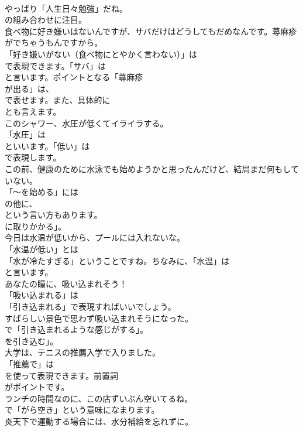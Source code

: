 \documentclass[8pt]{extreport}
\begin{document}
\begin{CJK}{UTF8}{min}
\\	やっぱり「人生日々勉強」だね。 
\\	の組み合わせに注目。	
\\	食べ物に好き嫌いはないんですが、サバだけはどうしてもだめなんです。蕁麻疹がでちゃうもんですから。 
\\	「好き嫌いがない（食べ物にとやかく言わない）」は
\\	で表現できます。「サバ」は
\\	と言います。ポイントとなる「蕁麻疹
\\	が出る」は、
\\	で表せます。また、具体的に
\\	とも言えます。	
\\	このシャワー、水圧が低くてイライラする。 
\\	「水圧」は 
\\	といいます。「低い」は 
\\	で表現します。	
\\	この前、健康のために水泳でも始めようかと思ったんだけど、結局まだ何もしていない。 
\\	「～を始める」には
\\	の他に、
\\	という言い方もあります。
\\	に取りかかる」。	
\\	今日は水温が低いから、プールには入れないな。 
\\	「水温が低い」とは
\\	「水が冷たすぎる」ということですね。ちなみに、「水温」は
\\	と言います。	
\\	あなたの瞳に、吸い込まれそう！ 
\\	「吸い込まれる」は
\\	「引き込まれる」で表現すればいいでしょう。	
\\	すばらしい景色で思わず吸い込まれそうになった。 
\\	で「引き込まれるような感じがする」。
\\	を引き込む」。	
\\	大学は、テニスの推薦入学で入りました。 
\\	「推薦で」は
\\	を使って表現できます。前置詞
\\	がポイントです。	
\\	ランチの時間なのに、この店ずいぶん空いてるね。 
\\	で「がら空き」という意味になまります。	
\\	炎天下で運動する場合には、水分補給を忘れずに。 

\end{CJK}
\end{document}
